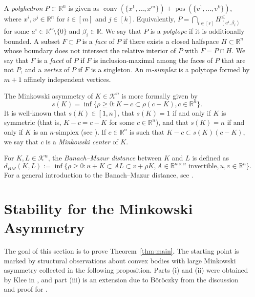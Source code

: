 \documentclass{amsart}
\newcommand{\cemph}[1]{\emph{\color{red}#1}}
\newcommand\R{\mathbb{R}}
\newcommand\CK{\mathcal{K}}
\DeclareMathOperator{\conv}{conv}
\DeclareMathOperator{\pos}{pos}
\begin{document}
A \cemph{polyhedron} $P \subset \R^n$ is given as $\conv(\{x^1, \dots, x^m \}) + \pos(\{ v^1, \dots, v^k \})$, where $x^i, v^j \in \R^n$ for $i \in [m]$ and $j \in [k]$.
Equivalently, $P = \bigcap_{i \in [r]} H_{(a^i,\beta_i)}^\leq$ for some $a^i \in \R^n \setminus \{0\}$ and $\beta_i \in \R$.
We say that $P$ is a \cemph{polytope} if it is additionally bounded.
A subset $F \subset P$ is a \cemph{face} of $P$ if there exists a closed halfspace $H \subset \R^n$ whose boundary does not intersect the relative interior of $P$ with $F = P \cap H$.
We say that $F$ is a \cemph{facet} of $P$ if $F$ is inclusion-maximal among the faces of $P$ that are not $P$,
and a \cemph{vertex} of $P$ if $F$ is a singleton.
An \cemph{$m$-simplex} is a polytope formed by $m+1$ affinely independent vertices.

The Minkowski asymmetry of $K\in\CK^n$ is more formally given by
\[
    s(K)
    = \inf\{\rho \geq 0: K - c \subset \rho (c-K), c \in \R^n \}.
\]
It is well-known that $s(K) \in [1,n]$,
that $s(K)=1$ if and only if $K$ is symmetric (that is, $K-c = c-K$ for some $c \in \R^n$),
and that $s(K)=n$ if and only if $K$ is an $n$-simplex (see \cite{1963:Grunbaum}).
If $c \in \R^n$ is such that $K-c \subset s(K)(c-K)$,
we say that $c$ is a \cemph{Minkowski center} of $K$.

For $K,L \in \CK^n$, the \cemph{Banach--Mazur distance} between $K$ and $L$ is defined as
\[
    d_{BM}(K,L)
    := \inf\{ \rho\geq 0: u + K \subset AL \subset v + \rho K, A \in \R^{n \times n} \text{ invertible}, u,v \in \R^n\}.
\]
For a general introduction to the Banach--Mazur distance, see \cite{1989:Tomczak-Jaegermann}.





\section{Stability for the Minkowski Asymmetry}\label{sec:StabilityNearSimplex}



The goal of this section is to prove Theorem~\ref{thm:main}.
The starting point is marked by structural observations about convex bodies with large Minkowski asymmetry collected in the following proposition.
Parts (i) and (ii) were obtained by Klee in \cite[($3.10$)]{1953:Klee},
and part (iii) is an extension due to B\"or\"oczky from the discussion and proof for \cite[Proposition~$13$]{2005:Böröczky}.
\pagebreak
\end{document}
